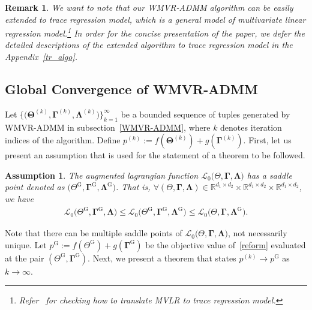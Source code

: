 \documentclass[12pt]{article}
\newtheorem{remark}[theorem]{Remark}
\newtheorem{assumption}{Assumption}
\begin{document}
\begin{remark}
We want to note that our WMVR-ADMM algorithm can be easily extended to trace regression model, which is a general model of multivariate linear regression model.\footnote{Refer~\citet{negahban2011estimation} for checking how to translate MVLR to trace regression model.}
In order for the concise presentation of the paper, we defer the detailed descriptions of the extended algorithm to trace regression model in the Appendix~\ref{tr_algo}.
\end{remark}

\subsection{Global Convergence of WMVR-ADMM}
Let $\{\big(\boldsymbol{\Theta}^{(k)},\boldsymbol{\Gamma}^{(k)},\boldsymbol{\Lambda}^{(k)}\big)\}_{k=1}^{\infty}$ be a bounded sequence of tuples generated by WMVR-ADMM in subsection~\ref{WMVR-ADMM}, where $k$ denotes iteration indices of the algorithm.
Define $p^{(k)}:=f(\boldsymbol{\Theta}^{(k)})+g(\boldsymbol{\Gamma}^{(k)})$.
First, let us present an assumption that is used for the statement of a theorem to be followed.

\begin{assumption}
The augmented lagrangian function $\mathcal{L}_{0} \big( \Theta,\boldsymbol{\Gamma},\boldsymbol{\Lambda} \big)$ has a saddle point denoted as $\big( \Theta^{\text{G}},\boldsymbol{\Gamma}^{\text{G}},\boldsymbol{\Lambda}^{\text{G}} \big)$.
That is, $\forall (\Theta, \boldsymbol{\Gamma}, \boldsymbol{\Lambda})\in \mathbb{R}^{d_{1} \times d_{2}} \times \mathbb{R}^{d_{1} \times d_{2}}
\times \mathbb{R}^{d_{1} \times d_{2}}$, we have
\begin{align}
    \mathcal{L}_{0} \big( \Theta^{\text{G}},\boldsymbol{\Gamma}^{\text{G}},\boldsymbol{\Lambda} \big) \leq 
    \mathcal{L}_{0} \big( \Theta^{\text{G}},\boldsymbol{\Gamma}^{\text{G}},\boldsymbol{\Lambda}^{\text{G}} \big) \leq
    \mathcal{L}_{0} \big( \Theta,\boldsymbol{\Gamma},\boldsymbol{\Lambda}^{\text{G}} \big).
\end{align}
\end{assumption}

Note that there can be multiple saddle points of $\mathcal{L}_{0} \big( \Theta,\boldsymbol{\Gamma},\boldsymbol{\Lambda} \big)$, not necessarily unique.
Let $p^{\text{G}}:=f(\Theta^{\text{G}})+g(\boldsymbol{\Gamma}^{\text{G}})$ be the objective value of~\eqref{reform} evaluated at the pair 
$(\Theta^{\text{G}},\boldsymbol{\Gamma}^{\text{G}})$.
Next, we present a theorem that states $p^{(k)}\rightarrow{p^{\text{G}}}$ as $k\rightarrow{\infty}$.
\end{document}
